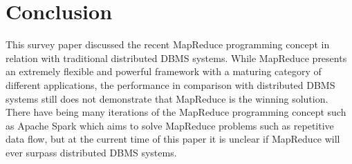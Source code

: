 \documentclass[10pt,twocolumn]{IEEEtran11}
\begin{document}
\section{Conclusion}
This survey paper discussed the recent MapReduce programming concept in relation with traditional distributed DBMS systems.  While MapReduce presents an extremely flexible and powerful framework with a maturing category of different applications, the performance in comparison with distributed DBMS systems still does not demonstrate that MapReduce is the winning solution.  There have being many iterations of the MapReduce programming concept such as Apache Spark which aims to solve MapReduce problems such as repetitive data flow, but at the current time of this paper it is unclear if MapReduce will ever surpass distributed DBMS systems.










\end{document}
